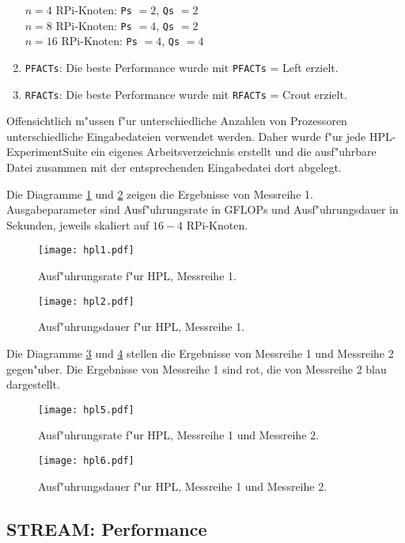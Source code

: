\begin{enumerate}
$n=4$ RPi-Knoten: \texttt{Ps} $=2$, \texttt{Qs} $=2$\\ 
$n=8$ RPi-Knoten: \texttt{Ps} $=4$, \texttt{Qs} $=2$\\ 
$n=16$ RPi-Knoten: \texttt{Ps} $=4$, \texttt{Qs} $=4$
	\item \texttt{PFACTs}: Die beste Performance wurde mit \texttt{PFACTs} = Left erzielt. 
	\item \texttt{RFACTs}: Die beste Performance wurde mit \texttt{RFACTs} = Crout erzielt.
\end{enumerate}
Offensichtlich m"ussen f"ur unterschiedliche Anzahlen von Prozessoren unterschiedliche Eingabedateien verwendet werden. Daher wurde f"ur jede HPL-ExperimentSuite ein eigenes Arbeitsverzeichnis erstellt und die ausf"uhrbare Datei zusammen mit der entsprechenden Eingabedatei dort abgelegt. 

Die Diagramme \ref{fig:hpl1} und \ref{fig:hpl2} zeigen die Ergebnisse von Messreihe 1. Ausgabeparameter sind Ausf"uhrungsrate in GFLOPs und Ausf"uhrungsdauer in Sekunden, jeweils skaliert auf $16-4$ RPi-Knoten.
\begin{figure}[htb]
  \centering
  \texttt{[image: hpl1.pdf]}\\ 
  \caption{Ausf"uhrungsrate f"ur HPL, Messreihe 1.}
  \label{fig:hpl1}		
\end{figure}
\begin{figure}[htb]
  \centering
  \texttt{[image: hpl2.pdf]}\\ 
  \caption{Ausf"uhrungsdauer f"ur HPL, Messreihe 1.}
  \label{fig:hpl2}		
\end{figure}
\noindent
Die Diagramme \ref{fig:hpl5} und \ref{fig:hpl6} stellen die Ergebnisse von Messreihe 1 und Messreihe 2 gegen"uber. Die Ergebnisse von Messreihe 1 sind rot, die von Messreihe 2 blau dargestellt.
\begin{figure}[htb]
  \centering
  \texttt{[image: hpl5.pdf]}\\ 
  \caption{Ausf"uhrungsrate f"ur HPL, Messreihe 1 und Messreihe 2.}\label{fig:hpl5}
\end{figure}
\begin{figure}[htb]
  \centering
  \texttt{[image: hpl6.pdf]}\\ 
  \caption{Ausf"uhrungsdauer f"ur HPL, Messreihe 1 und Messreihe 2.}\label{fig:hpl6}
\end{figure}

\subsection{STREAM: Performance}\label{Ergebnisse-STREAM}

